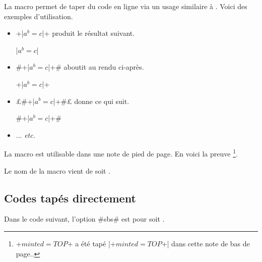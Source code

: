 \documentclass[10pt, a4paper]{article}
\begin{document}
La macro  permet de taper du code en ligne via un usage similaire à .
Voici des exemples d'utilisation.
\begin{itemize}
    \item \bdocinlatex+\bdocinlatex|$a^b = c$|+
          produit le résultat suivant.

          \bdocinlatex|$a^b = c$|

    \item \bdocinlatex#\bdocinlatex+\bdocinlatex|$a^b = c$|+#
          aboutit au rendu ci-après.

          \bdocinlatex+\bdocinlatex|$a^b = c$|+

    \item \bdocinlatex£\bdocinlatex#\bdocinlatex+\bdocinlatex|$a^b = c$|+#£
          donne ce qui suit.

          \bdocinlatex#\bdocinlatex+\bdocinlatex|$a^b = c$|+#

    \item ... \emph{etc.}
\end{itemize}


\begin{bdocimportant}
    La macro  est utilisable dans une note de pied de page. En voici la preuve
    \footnote{
        \bdocinlatex+$minted = TOP$+ a été tapé \bdocinlatex|\bdocinlatex+$minted = TOP$+| dans cette note de bas de page..
    }.
\end{bdocimportant}


\begin{bdocrem}
    Le nom de la macro  vient de  soit .
\end{bdocrem}




\subsection{Codes tapés directement}

\begin{bdocexa}
    Dans le code suivant, l'option \bdocinlatex#sbs# est pour  soit .

\end{bdocexa}


\end{document}
